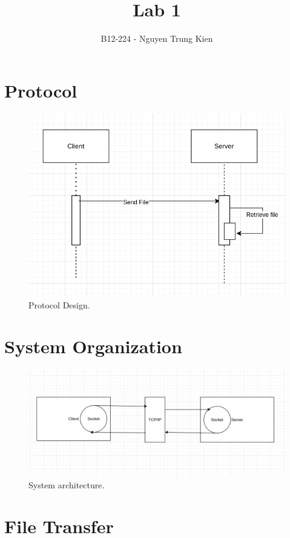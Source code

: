 \documentclass{article}
\title{Lab 1}
\author{B12-224 - Nguyen Trung Kien}
\begin{document}
\maketitle

\section{Protocol}

\begin{figure}[h]
\centering
\includegraphics[width=0.8\linewidth]{Protocol.png}
\caption{\label{fig:Protocol}Protocol Design.}
\end{figure}

\section{System Organization}

\begin{figure}[h]
\centering
\includegraphics[width=0.8\linewidth]{System.png} %
\caption{\label{fig:System}System architecture.}
\end{figure}

\section{File Transfer}
\end{document}
